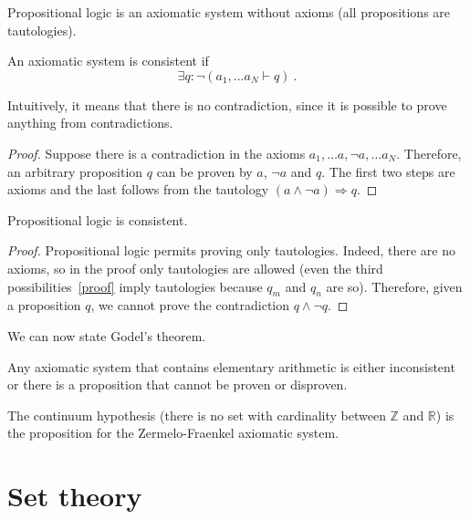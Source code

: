     \noindent Propositional logic is an axiomatic system without axioms (all propositions are tautologies).

    \begin{definition}
        An axiomatic system is consistent if 
        \begin{equation*}
            \exists q \colon \lnot (a_1, \ldots a_N \vdash q) ~.
        \end{equation*}
    \end{definition}

    \noindent Intuitively, it means that there is no contradiction, since it is possible to prove anything from contradictions. 

    \begin{proof}
        Suppose there is a contradiction in the axioms $a_1, \ldots a, \lnot a , \ldots a_N$. Therefore, an arbitrary proposition $q$ can be proven by $a$, $\lnot a$ and $q$. The first two steps are axioms and the last follows from the tautology $(a \land \lnot a) \Rightarrow q$.
    \end{proof}

    \begin{theorem}
        Propositional logic is consistent.
    \end{theorem}
    \begin{proof}
        Propositional logic permits proving only tautologies. Indeed, there are no axioms, so in the proof only tautologies are allowed (even the third possibilities~\eqref{proof} imply tautologies because $q_m$ and $q_n$ are so). Therefore, given a proposition $q$, we cannot prove the contradiction $q \land \lnot q$.
    \end{proof}

    We can now state Godel's theorem.

    \begin{theorem}
        Any axiomatic system that contains elementary arithmetic is either inconsistent or there is a proposition that cannot be proven or disproven.
    \end{theorem}

    The continuum hypothesis (there is no set with cardinality between $\mathbb Z$ and $\mathbb R$) is the proposition for the Zermelo-Fraenkel axiomatic system.

\chapter{Set theory}

